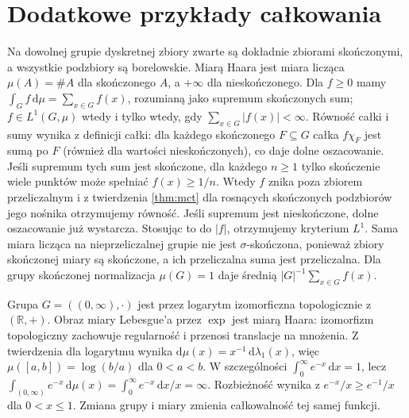 \section{Dodatkowe przykłady całkowania}
\begin{przyklad}
Na dowolnej grupie dyskretnej zbiory zwarte są dokładnie zbiorami skończonymi, a wszystkie podzbiory są borelowskie. Miarą Haara jest miara licząca $\mu(A)=\#A$ dla skończonego $A$, a $+\infty$ dla nieskończonego. Dla $f\ge0$ mamy $\int_Gf\,\mathrm d\mu=\sum_{x\in G}f(x)$, rozumianą jako supremum skończonych sum; $f\in L^1(G,\mu)$ wtedy i tylko wtedy, gdy $\sum_{x\in G}|f(x)|<\infty$. Równość całki i sumy wynika z definicji całki:
dla każdego skończonego $F\subseteq G$ całka
$f\chi_F$ jest sumą po $F$ (również dla wartości
nieskończonych), co daje dolne oszacowanie.
Jeśli supremum tych sum jest skończone, dla każdego
$n\ge1$ tylko skończenie wiele punktów może spełniać
$f(x)\ge1/n$. Wtedy $f$ znika poza zbiorem
przeliczalnym i z twierdzenia \ref{thm:mct}
dla rosnących skończonych podzbiorów jego nośnika
otrzymujemy równość. Jeśli supremum jest nieskończone,
dolne oszacowanie już wystarcza.
Stosując to do $|f|$, otrzymujemy kryterium $L^1$.
Sama miara licząca na nieprzeliczalnej grupie nie jest
$\sigma$-skończona, ponieważ zbiory skończonej miary
są skończone, a ich przeliczalna suma jest przeliczalna. Dla grupy skończonej normalizacja $\mu(G)=1$ daje średnią $|G|^{-1}\sum_{x\in G}f(x)$.
\end{przyklad}
\begin{przyklad}
Grupa $G=((0,\infty),\cdot)$ jest przez logarytm izomorficzna topologicznie z $(\mathbb{R},+)$. Obraz miary Lebesgue'a przez $\exp$ jest miarą
Haara: izomorfizm topologiczny zachowuje regularność
i przenosi translacje na mnożenia. Z twierdzenia
 dla logarytmu wynika
$\mathrm d\mu(x)=x^{-1}\,\mathrm d\lambda_1(x)$,
więc $\mu([a,b])=\log(b/a)$ dla $0<a<b$. W szczególności $\int_0^\infty e^{-x}\,\mathrm dx=1$, lecz $\int_{(0,\infty)}e^{-x}\,\mathrm d\mu(x)=\int_0^\infty e^{-x}\,\mathrm dx/x=\infty$. Rozbieżność wynika z $e^{-x}/x\ge e^{-1}/x$
dla $0<x\le1$. Zmiana grupy i miary zmienia
całkowalność tej samej funkcji.
\end{przyklad}

